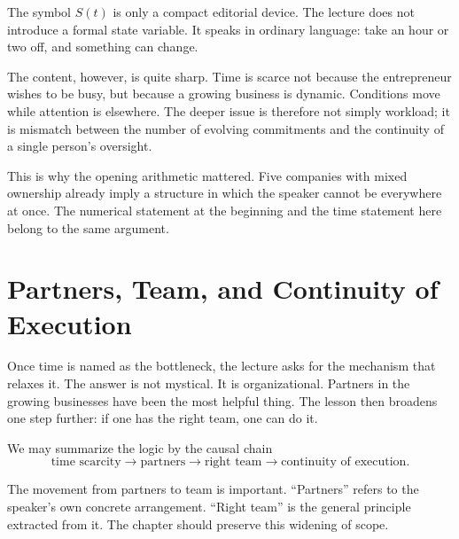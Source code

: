 \begin{remark}
The symbol \(S(t)\) is only a compact editorial device. The lecture does not introduce a formal state variable. It speaks in ordinary language: take an hour or two off, and something can change.
\end{remark}

The content, however, is quite sharp. Time is scarce not because the entrepreneur wishes to be busy, but because a growing business is dynamic. Conditions move while attention is elsewhere. The deeper issue is therefore not simply workload; it is mismatch between the number of evolving commitments and the continuity of a single person's oversight.

This is why the opening arithmetic mattered. Five companies with mixed ownership already imply a structure in which the speaker cannot be everywhere at once. The numerical statement at the beginning and the time statement here belong to the same argument.

\section{Partners, Team, and Continuity of Execution}

Once time is named as the bottleneck, the lecture asks for the mechanism that relaxes it. The answer is not mystical. It is organizational. Partners in the growing businesses have been the most helpful thing. The lesson then broadens one step further: if one has the right team, one can do it.

We may summarize the logic by the causal chain
\begin{equation}
\text{time scarcity}
\to
\text{partners}
\to
\text{right team}
\to
\text{continuity of execution}.
\end{equation}

The movement from partners to team is important. ``Partners'' refers to the speaker's own concrete arrangement. ``Right team'' is the general principle extracted from it. The chapter should preserve this widening of scope.

\begin{figure}
\centering
{}
\end{figure}

